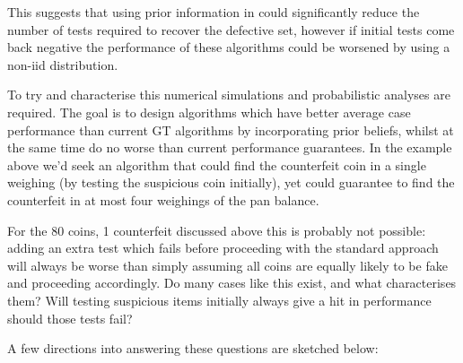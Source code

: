\documentclass[12pt, a4paper]{article}
\begin{document}
This suggests that using prior information in could significantly reduce the number of tests required to recover the defective set, however if initial tests come back negative the performance of these algorithms could be worsened by using a non-iid distribution. 

To try and characterise this numerical simulations and probabilistic analyses are required. The goal is to design algorithms which have better average case performance than current GT algorithms by incorporating prior beliefs, whilst at the same time do no worse than current performance guarantees. In the example above we'd seek an algorithm that could find the counterfeit coin in a single weighing (by testing the suspicious coin initially), yet could guarantee to find the counterfeit in at most four weighings of the pan balance. 

For the 80 coins, 1 counterfeit discussed above this is probably not possible: adding an extra test which fails before proceeding with the standard approach will always be worse than simply assuming all coins are equally likely to be fake and proceeding accordingly. Do many cases like this exist, and what characterises them? Will testing suspicious items initially always give a hit in performance should those tests fail? 

A few directions into answering these questions are sketched below:
\end{document}
